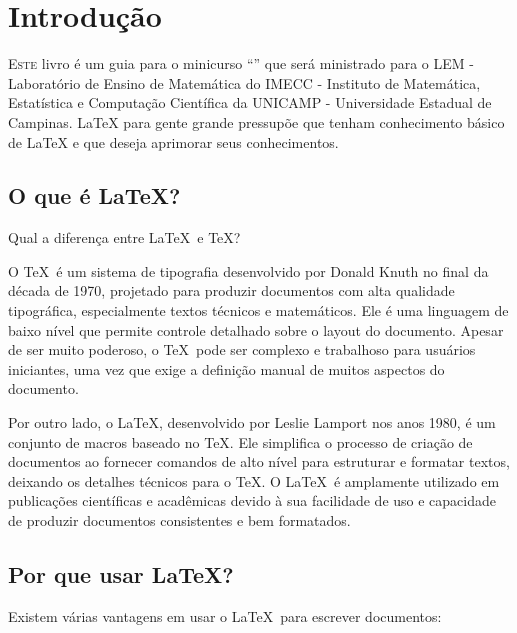 \chapter{Introdução}

\lettrine{E}{ste} livro é um guia para o minicurso ``\booktitle'' que será ministrado para o LEM - Laboratório de Ensino de Matemática do IMECC - Instituto de Matemática, Estatística e Computação Científica da UNICAMP - Universidade Estadual de Campinas. LaTeX para gente grande pressupõe que tenham conhecimento básico de LaTeX e que deseja aprimorar seus conhecimentos. 


\section{O que é \LaTeX?}

Qual a diferença entre \LaTeX\ e \TeX?

O \TeX\ é um sistema de tipografia desenvolvido por Donald Knuth no final da década de 1970, projetado para produzir documentos com alta qualidade tipográfica, especialmente textos técnicos e matemáticos. Ele é uma linguagem de baixo nível que permite controle detalhado sobre o layout do documento. Apesar de ser muito poderoso, o \TeX\ pode ser complexo e trabalhoso para usuários iniciantes, uma vez que exige a definição manual de muitos aspectos do documento.

Por outro lado, o \LaTeX, desenvolvido por Leslie Lamport nos anos 1980, é um conjunto de macros baseado no \TeX. Ele simplifica o processo de criação de documentos ao fornecer comandos de alto nível para estruturar e formatar textos, deixando os detalhes técnicos para o \TeX. O \LaTeX\ é amplamente utilizado em publicações científicas e acadêmicas devido à sua facilidade de uso e capacidade de produzir documentos consistentes e bem formatados.

\section{Por que usar \LaTeX?}

Existem várias vantagens em usar o \LaTeX\ para escrever documentos:

